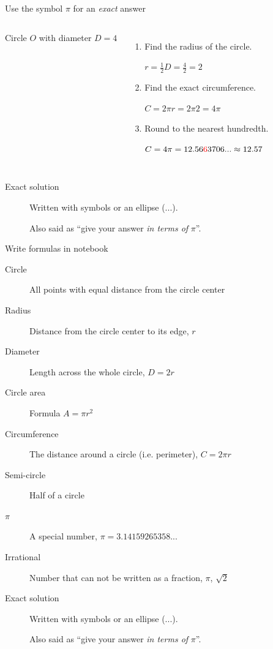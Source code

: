 \begin{frame}{Use the symbol $\pi$ for an \emph{exact} answer}
    \begin{columns}
        Circle $O$ with diameter $D=4$
        \begin{enumerate}
            \item Find the radius of the circle. \par \medskip
              {$r = \frac{1}{2}D = \frac{4}{2} =2 $} \medskip
            \item Find the exact circumference. \par \medskip
              {$C = 2 \pi r = 2 \pi 2 = 4 \pi $} \medskip
            \item Round to the nearest hundredth. \par \medskip
              $C = 4 \pi = 12.56{\color{red}6}3706... \approx 12.57 $
        \end{enumerate}
    \end{columns} \vspace{2cm}
    \begin{description}
        \item[Exact solution] Written with symbols or an ellipse ($...$). \par 
        Also said as ``give your answer \emph{in terms of} $\pi$''.
    \end{description}
    \end{frame}
    
\begin{frame}{Write formulas in notebook}
    \begin{description}
        \item[Circle] All points with equal distance from the circle center
        \item[Radius] Distance from the circle center to its edge, $r$
        \item[Diameter] Length across the whole circle, $D=2r$        
        \item[Circle area] Formula $A=\pi r^2$
        \item[Circumference] The distance around a circle (i.e. perimeter), $C=2\pi r$
        \item[Semi-circle] Half of a circle
        \item[{\Large $\pi$}] A special number, $\pi = 3.14159265358...$
        \item[Irrational] Number that can not be written as a fraction, $\pi$, $\sqrt{2}$
        \item[Exact solution] Written with symbols or an ellipse ($...$). \par 
        Also said as ``give your answer \emph{in terms of} $\pi$''.
        \end{description}
    \end{frame}

